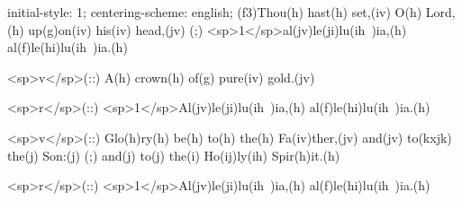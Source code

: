 initial-style: 1;
centering-scheme: english;
(f3)Thou(h) hast(h) set,(iv) O(h) Lord,(h) up(g)on(iv) his(iv) head,(jv) (;) <sp>1</sp>al(jv)le(ji)lu(ih~)ia,(h) al(f)le(hi)lu(ih~)ia.(h)

<sp>v</sp>(::) A(h) crown(h) of(g) pure(iv) gold.(jv)

<sp>r</sp>(::) <sp>1</sp>Al(jv)le(ji)lu(ih~)ia,(h) al(f)le(hi)lu(ih~)ia.(h)

<sp>v</sp>(::) Glo(h)ry(h) be(h) to(h) the(h) Fa(iv)ther,(jv) and(jv) to(kxjk) the(j) Son:(j) (;) and(j) to(j) the(i) Ho(ij)ly(ih) Spir(h)it.(h)

<sp>r</sp>(::) <sp>1</sp>Al(jv)le(ji)lu(ih~)ia,(h) al(f)le(hi)lu(ih~)ia.(h)